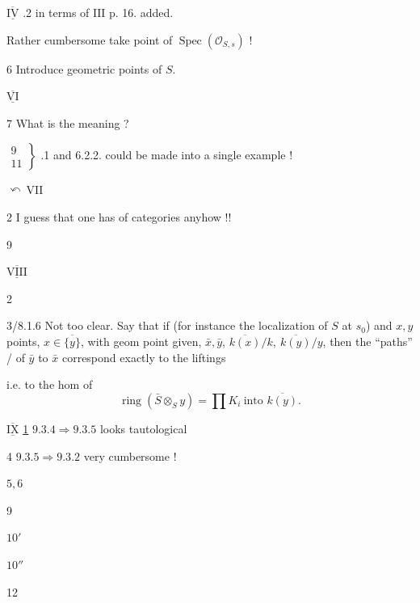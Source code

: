 $\underline{\overline{\mathrm{IV}}}$ \quad {} .2 \quad {} in terms of $\mathrm{III}$ p. 16. added.

Rather  cumbersome\unsure{;|,} take point of $\operatorname{Spec}(\mathcal O_{S,s})$ !

6 \qquad Introduce geometric points of $S$.

$\underline{\overline{\mathrm{VI}}}$  \quad {}

7 \quad What is the meaning ?

$\left.\begin{gathered}9\\11\end{gathered}\right\}$ .1 and 6.2.2. could be made into a single example !

$\curvearrowleft\ \mathrm{VII}$ 

2 \quad I guess that one has  of categories anyhow !!

9

$\underline{\overline{\mathrm{VIII}}}$ 

2

3/8.1.6 Not too clear. Say that if
 
(for instance the localization of $S$ at $s_0$) and
$x,y$  points, $x\in\overline{\{y\}}$,
 with geom point given, $\bar x,\bar y$,
$\overline{k(x)}/k,\ \overline{k(y)}/y$, then the ``paths'' / of $\bar y$ to $\bar x$
correspond exactly to the  liftings


i.e. to the hom of
\[
 \operatorname{ring}(\bar S\otimes_S y)=\prod K_i
 \ \text{into }\overline{k(y)}.
\]

$\underline{\overline{\mathrm{IX}}}$ \quad \uline{1}  \qquad $9.3.4\Rightarrow9.3.5$ looks tautological

4 \qquad $9.3.5\Rightarrow9.3.2$ very cumbersome !

$5,6$

9

$10'$ 

$10''$ 

12

